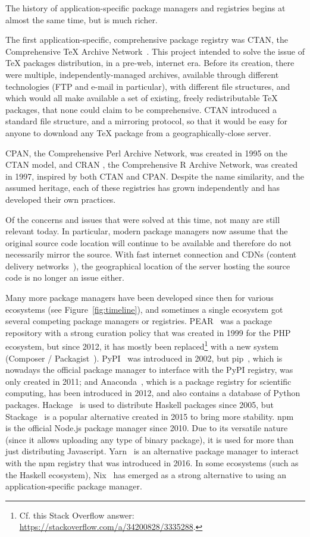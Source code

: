 The history of application-specific package managers and registries begins at almost the same time, but is much richer.

The first application-specific, comprehensive package registry was CTAN, the Comprehensive TeX Archive Network~\cite{greenwade1993comprehensive}.
This project intended to solve the issue of TeX packages distribution, in a pre-web, internet era.
Before its creation, there were multiple, independently-managed archives, available through different technologies (FTP and e-mail in particular), with different file structures, and which would all make available a set of existing, freely redistributable TeX packages, that none could claim to be comprehensive.
CTAN introduced a standard file structure, and a mirroring protocol, so that it would be easy for anyone to download any TeX package from a geographically-close server.

CPAN, the Comprehensive Perl Archive Network, was created in 1995 on the CTAN model, and CRAN \cite{hornik2012comprehensive}, the Comprehensive R Archive Network, was created in 1997, inspired by both CTAN and CPAN.
Despite the name similarity, and the assumed heritage, each of these registries has grown independently and has developed their own practices.

Of the concerns and issues that were solved at this time, not many are still relevant today.
In particular, modern package managers now assume that the original source code location will continue to be available and therefore do not necessarily mirror the source.
With fast internet connection and CDNs (content delivery networks~\cite{buyya2008content}), the geographical location of the server hosting the source code is no longer an issue either.

Many more package managers have been developed since then for various ecosystems (see Figure~\ref{fig:timeline}), and sometimes a single ecosystem got several competing package managers or registries.
PEAR~\cite{pear} was a package repository with a strong curation policy that was created in 1999 for the PHP ecosystem, but since 2012, it has mostly been replaced\footnote{
	Cf. this Stack Overflow answer: \url{https://stackoverflow.com/a/34200828/3335288}.
} with a new system (Composer / Packagist~\cite{composer}).
PyPI~\cite{pypi} was introduced in 2002, but pip~\cite{pip}, which is nowadays the official package manager to interface with the PyPI registry, was only created in 2011; and Anaconda~\cite{anaconda}, which is a package registry for scientific computing, has been introduced in 2012, and also contains a database of Python packages.
Hackage~\cite{hackage} is used to distribute Haskell packages since 2005, but Stackage~\cite{stackage} is a popular alternative created in 2015 to bring more stability.
npm~\cite{npm} is the official Node.js package manager since 2010.
Due to its versatile nature (since it allows uploading any type of binary package), it is used for more than just distributing Javascript.
Yarn~\cite{yarn} is an alternative package manager to interact with the npm registry that was introduced in 2016.
In some ecosystems (such as the Haskell ecosystem), Nix~\cite{dolstra2004nix} has emerged as a strong alternative to using an application-specific package manager.

